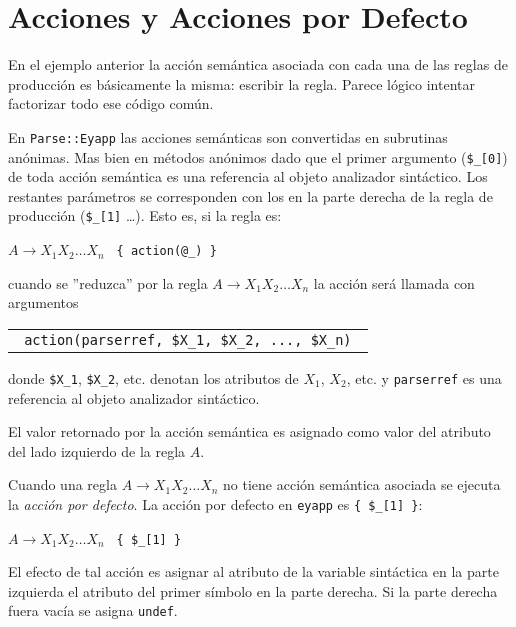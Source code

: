 \section{Acciones y Acciones por Defecto}
\label{section:accionesyaccionespordefecto}
En el ejemplo anterior la acción semántica asociada con cada una de las reglas de
producción es básicamente la misma: escribir la regla.
Parece lógico intentar factorizar todo ese código común.


En \verb|Parse::Eyapp| las acciones semánticas son convertidas en subrutinas
anónimas. Mas bien en métodos anónimos dado que el primer argumento (\verb|$_[0]|)
de toda acción semántica es una referencia al objeto analizador sintáctico. 
Los restantes parámetros
se corresponden con los 
en la parte derecha de la regla de producción (\verb|$_[1]| \ldots ).
Esto es, si la regla es:

\begin{center}
\( A \rightarrow X_1 X_2 \ldots X_n \) \verb| { action(@_) } |
\end{center}

cuando se ''reduzca'' por la regla $A \rightarrow X_1 X_2 \ldots X_n$ 
la acción será llamada con argumentos

\begin{center}
\begin{tabular}{p{12cm}}
\verb| action(parserref, $X_1, $X_2, ..., $X_n) |
\end{tabular}
\end{center}

donde \verb|$X_1|, \verb|$X_2|, etc. denotan los atributos de $X_1$, $X_2$, etc.
y  \verb|parserref| es una referencia al objeto analizador sintáctico.

El valor retornado por la acción semántica es asignado como valor del atributo 
del lado izquierdo de la regla $A$.

Cuando una regla $A \rightarrow X_1 X_2 \ldots X_n$
no tiene acción semántica asociada se ejecuta la \emph{acción por defecto}.
La acción por defecto en \verb|eyapp| es \verb|{ $_[1] }|: 

\begin{center}
\( A \rightarrow X_1 X_2 \ldots X_n \) \verb| { $_[1] } |
\end{center}

El efecto de tal acción
es asignar al atributo de la variable sintáctica en la parte izquierda
el atributo del primer símbolo en la parte derecha. Si la parte derecha
fuera vacía se asigna \verb|undef|.

